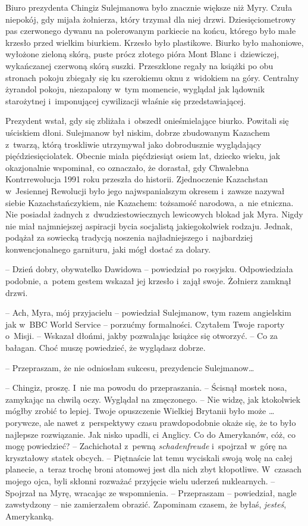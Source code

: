 \documentclass[oneside,polish,11pt,sfheadings]{mwbk}
\begin{document}
Biuro prezydenta Chingiz Sulejmanowa było znacznie większe niż Myry.
Czuła niepokój, gdy mijała żołnierza, który trzymał dla niej drzwi.
Dziesięciometrowy pas czerwonego dywanu na polerowanym parkiecie na
końcu, którego było małe krzesło przed wielkim biurkiem. Krzesło było
plastikowe. Biurko było mahoniowe, wyłożone zieloną skórą, puste prócz
złotego pióra Mont Blanc i~dziewiczej, wykańczanej czerwoną skórą
suszki. Przeszklone regały na książki po obu stronach pokoju zbiegały
się ku szerokiemu oknu z~widokiem na góry. Centralny żyrandol pokoju,
niezapalony w~tym momencie, wyglądał jak lądownik starożytnej i~imponującej cywilizacji właśnie się przedstawiającej.

Prezydent wstał, gdy się zbliżała i~obszedł onieśmielające biurko.
Powitali się uściskiem dłoni. Sulejmanow był niskim, dobrze zbudowanym
Kazachem z~twarzą, którą troskliwie utrzymywał jako dobrodusznie
wyglądający pięćdziesięciolatek. Obecnie miała pięćdziesiąt osiem lat,
dziecko wieku, jak okazjonalnie wspominał, co oznaczało, że dorastał,
gdy Chwalebna Kontrrewolucja 1991 roku przeszła do historii.
Zjednoczenie Kazachstan w~Jesiennej Rewolucji było jego najwspanialszym
okresem i~zawsze nazywał siebie Kazachstańczykiem, nie Kazachem:
tożsamość narodowa, a~nie etniczna. Nie posiadał żadnych z~dwudziestowiecznych lewicowych blokad jak Myra. Nigdy nie miał
najmniejszej aspiracji bycia socjalistą jakiegokolwiek rodzaju. Jednak,
podążał za sowiecką tradycją noszenia najładniejszego i~najbardziej
konwencjonalnego garnituru, jaki mógł dostać za dolary.

-- Dzień dobry, obywatelko Dawidowa -- powiedział po rosyjsku.
Odpowiedziała podobnie, a~potem gestem wskazał jej krzesło i~zajął
swoje. Żołnierz zamknął drzwi.

-- Ach, Myra, mój przyjacielu -- powiedział Sulejmanow, tym razem
angielskim jak w~BBC World Service -- porzućmy formalności. Czytałem
Twoje raporty o~Misji. -- Wskazał dłońmi, jakby pozwalając książce się
otworzyć. -- Co za bałagan. Choć muszę powiedzieć, że wyglądasz dobrze.

-- Przepraszam, że nie odniosłam sukcesu, prezydencie Sulejmanow\ldots

-- Chingiz, proszę. I~nie ma powodu do przepraszania. -- Ścisnął mostek
nosa, zamykając na chwilą oczy. Wyglądał na zmęczonego. -- Nie widzę, jak
ktokolwiek mógłby zrobić to lepiej. Twoje opuszczenie Wielkiej Brytanii
było może \ldots porywcze, ale nawet z~perspektywy czasu prawdopodobnie
okaże się, że to było najlepsze rozwiązanie. Jak nisko upadli, ci
Anglicy. Co do Amerykanów, cóż, co mogę powiedzieć? -- Zachichotał z~pewną \textit{schadenfreude} i~spojrzał w~górę na kryształowy statek
obcych. -- Piętnaście lat temu wyciskali swoją wolę na całej planecie, a~teraz trochę broni atomowej jest dla nich zbyt kłopotliwe. W~czasach
mojego ojca, byli skłonni rozważać przyjęcie wielu uderzeń nuklearnych.
-- Spojrzał na Myrę, wracając ze wspomnienia. -- Przepraszam -- powiedział,
nagle zawstydzony -- nie zamierzałem obrazić. Zapominam czasem, że byłaś,
\textit{jesteś}, Amerykanką.
\end{document}
